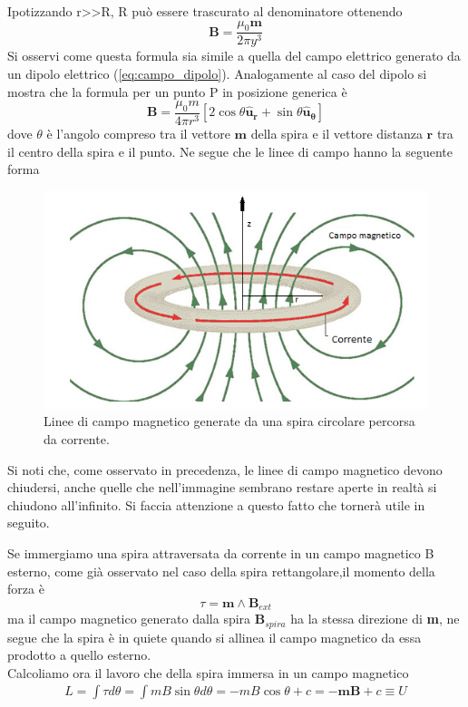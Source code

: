 \documentclass[
10pt, %
a4paper, %
oneside, %
headinclude,footinclude, %
BCOR5mm, %
]{scrartcl}
\begin{document}
\begin{esercizio}
Ipotizzando r>>R, R può essere trascurato al denominatore ottenendo 
\[\mathbf{B}=\frac{\mu_0 \mathbf{m}}{2\pi y^{3}}\]
Si osservi come questa formula sia simile a quella del campo elettrico generato da un dipolo elettrico (\ref{eq:campo_dipolo}). Analogamente al caso del dipolo si mostra che la formula per un punto P in posizione generica è  
\[\mathbf{B}=\frac{\mu_0 m }{4\pi r^3}[2\cos\theta\mathbf{\hat{u}_r}+\sin\theta\mathbf{\hat{u}_{\theta}}]\]
dove $\theta$ è l'angolo compreso tra il vettore \(\mathbf{m}\) della spira e il vettore distanza \(\mathbf{r}\) tra il centro della spira e il punto. Ne segue che le linee di campo hanno la seguente forma
\begin{figure}[h!]
	\centering
	\includegraphics[width=0.7\linewidth]{../images/linee_campo_magnetico_spira}
	\caption{Linee di campo magnetico generate da una spira circolare percorsa da corrente.}
	\label{fig:lineecampomagneticospira}
\end{figure}
\FloatBarrier
Si noti che, come osservato in precedenza, le linee di campo magnetico devono chiudersi, anche quelle che nell'immagine sembrano restare aperte in realtà si chiudono all'infinito. Si faccia attenzione a questo fatto che tornerà utile in seguito.  
\end{esercizio}
Se immergiamo una spira attraversata da corrente in un campo magnetico B esterno, come già osservato nel caso della spira rettangolare,il momento della forza è 
\[\tau = \mathbf{m}\wedge\mathbf{B}_{ext}\]
ma il campo magnetico generato dalla spira \(\mathbf{B}_{spira}\) ha la stessa direzione di \textbf{m}, ne segue che la spira è in quiete quando si allinea il campo magnetico da essa prodotto a quello esterno.\\
Calcoliamo ora il lavoro che della spira immersa in un campo magnetico
\begin{align}\label{eq:pot_spira}
	L = \int \tau d\theta= \int m B \sin\theta d\theta= -mB\cos\theta + c= -\mathbf{m}\mathbf{B}+c \equiv U
\end{align}
\end{document}

